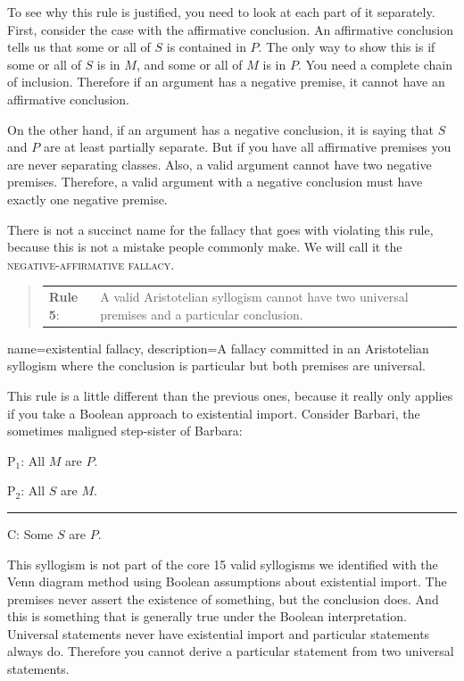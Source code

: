 To see why this rule is justified, you need to look at each part of it separately. First, consider the case with the affirmative conclusion. An affirmative conclusion tells us that some or all of $S$ is contained in $P$. The only way to show this is if some or all of $S$ is in $M$, and some or all of $M$ is in $P$. You need a complete chain of inclusion. Therefore if an argument has a negative premise, it cannot have an affirmative conclusion. 

On the other hand, if an argument has a negative conclusion, it is saying that $S$ and $P$ are at least partially separate. But if you have all affirmative premises you are never separating classes. Also, a valid argument cannot have two negative premises. Therefore, a valid argument with a negative conclusion must have exactly one negative premise. 

There is not a succinct name for the fallacy that goes with violating this rule, because this is not a mistake people commonly make. We will call it the \textsc{\gls{negative-affirmative fallacy}}. \label{def:negative-affirmative _fallacy}

\begin{quotation}
\begin{tabu}{p{.1\linewidth}p{.9\linewidth}}
\textbf{Rule 5}: & A valid Aristotelian syllogism cannot have two universal premises and a particular conclusion.
\end{tabu} \label{rule_5}
\end{quotation}


{
name=existential fallacy,
description={A fallacy committed in an Aristotelian syllogism where the conclusion is particular but both premises are universal. }
}

This rule is a little different than the previous ones, because it really only applies if you take a Boolean approach to existential import. Consider Barbari, the sometimes maligned step-sister of Barbara:

\begin{earg}
\item[P$_1$:] All $M$ are $P$.
\item[P$_2$:] All $S$ are $M$.
\vspace{-.5em}
\item [] \rule{0.2\linewidth}{.5pt} 
\item[C:] Some $S$ are $P$.
\end{earg} 

This syllogism is not part of the core 15 valid syllogisms we identified with the Venn diagram method using Boolean assumptions about existential import. The premises never assert the existence of something, but the conclusion does. And this is something that is generally true under the Boolean interpretation. Universal statements never have existential import and particular statements always do. Therefore you cannot derive a particular statement from two universal statements. 

